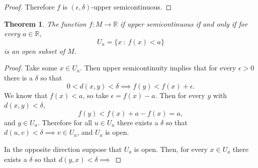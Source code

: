 \documentclass[letter]{article}
\newtheorem{theorem}{Theorem}
\newenvironment{menumerate}{%
  \edef\backupindent{\the\parindent}%
  \enumerate%
  \setlength{\parindent}{\backupindent}%
}{\endenumerate}
\begin{document}
\begin{menumerate}
\begin{menumerate}
\begin{proof}
        Therefore $f$ is  $(\epsilon, \delta)$-upper semicontinuous.
    \end{proof}
    \begin{theorem}
        The function $f: M \to \mathbb{R}$ if upper semicontinuous 
        if and only if for every $a \in \mathbb{R}$, 
        \begin{equation}
            U_a = \{ x \ :\ f(x) < a \}       
        \end{equation}
        is an open subset of $M$.
    \end{theorem}
    \begin{proof}
        Take some $x \in U_a$. Then upper semicontinuity implies that
        for every $\epsilon> 0$ there is a $\delta$ so that
        \begin{equation}
            0 < d(x,y) < \delta \implies f(y) < f(x) + \epsilon.       
         \end{equation}
         We know that $f(x) < a$, so take $\epsilon = f(x) - a.$
         Then for every $y$ with $d(x,y) < \delta$, 
         \begin{equation}
         f(y) < f(x) + a - f(x) = a,
         \end{equation}
         and $y \in U_a$. Therefore for all $u \in U_a$ there exists a $\delta$ so that $d(u,v) < \delta \implies v \in U_a$, and
         $U_a$ is open.

         In the opposite direction suppose that $U_a$ is open.
         Then, for every $x \in U_a$ there exists a $\delta$ so that
         $d(y,x) < \delta \implies $
    \end{proof}
     \end{menumerate} 
\end{menumerate}
\end{document}
